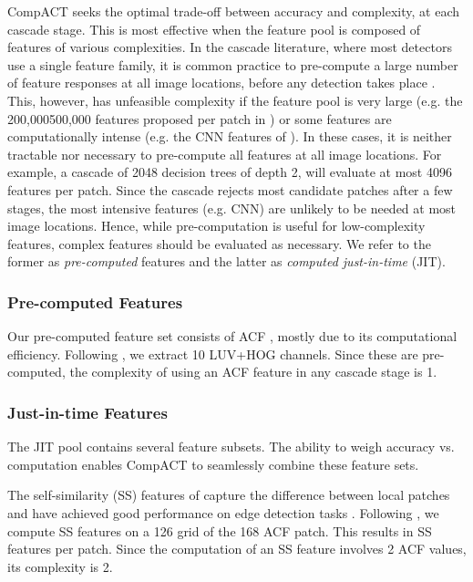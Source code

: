 \documentclass[10pt,twocolumn,letterpaper]{article}
\begin{document}
CompACT seeks the optimal trade-off between accuracy and
complexity, at each cascade stage. This is most effective when
the feature pool is composed of features of various complexities.
In the cascade literature, where most detectors use a single feature family,
it is common practice to pre-compute a large number of feature responses
at all image locations, before any detection takes place
\cite{DBLP:conf/nips/NamDH14,DBLP:journals/corr/ZhangBS15,
DBLP:conf/eccv/PaisitkriangkraiSH14}. This, however, has unfeasible complexity
if the feature pool is very large (e.g. the 200,000500,000
features proposed per patch in \cite{DBLP:journals/corr/ZhangBS15,
DBLP:conf/eccv/PaisitkriangkraiSH14}) or some features are
computationally intense (e.g. the CNN features
of \cite{DBLP:conf/nips/KrizhevskySH12,DBLP:journals/corr/SimonyanZ14a}).
In these cases, it is neither tractable nor necessary to pre-compute all
features at all image locations. For example, a cascade of 2048 decision
trees of depth 2, will evaluate at most 4096 features per patch. Since the
cascade rejects most candidate patches after a few stages, the
most intensive features (e.g. CNN) are unlikely to be needed at most
image locations. Hence, while pre-computation is useful for
low-complexity features, complex features should be evaluated as necessary.
We refer to the former as {\it pre-computed\/} features and the latter
as {\it computed just-in-time\/} (JIT).


\subsubsection{Pre-computed Features}

Our pre-computed feature set consists of
ACF \cite{DBLP:journals/pami/DollarABP14}, mostly due to its
computational efficiency. Following \cite{DBLP:journals/pami/DollarABP14}, we
extract 10 LUV+HOG channels. Since these are pre-computed, the
complexity of using an ACF feature in any cascade stage is 1.

\subsubsection{Just-in-time Features}

The JIT pool contains several feature subsets. The ability to weigh accuracy vs. computation enables CompACT to seamlessly combine these feature sets.

\vspace{.05in}
The self-similarity (SS) features of \cite{DBLP:conf/cvpr/ShechtmanI07} capture
the difference between local patches and have achieved good performance on
edge detection tasks \cite{DBLP:conf/cvpr/LimZD13,DBLP:conf/iccv/DollarZ13}.
Following \cite{DBLP:conf/cvpr/LimZD13,DBLP:conf/iccv/DollarZ13}, we compute
SS features on a 126 grid of the 168 ACF patch.
This results in  SS
features per patch. Since the computation of an SS feature involves 2
ACF values, its complexity is 2.
\end{document}
